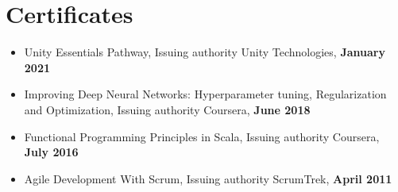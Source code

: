 \section*{Certificates}

\begin{itemize}[noitemsep, nosep]
  \item Unity Essentials Pathway, Issuing authority Unity Technologies, \textbf{January 2021}
  \item Improving Deep Neural Networks: Hyperparameter tuning, Regularization and Optimization, Issuing authority Coursera, \textbf{June 2018}
  \item Functional Programming Principles in Scala, Issuing authority Coursera, \textbf{July 2016}
  \item Agile Development With Scrum, Issuing authority ScrumTrek, \textbf{April 2011}
\end{itemize}
